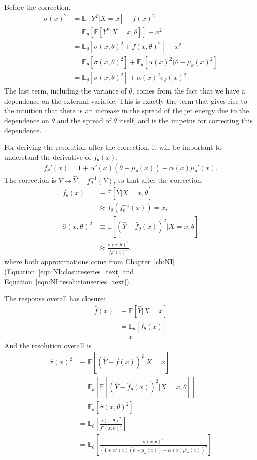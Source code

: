 Before the correction,
\begin{align}
  \sigma(x)^2 &=\mathbb{E}\left[Y^2|X=x\right]-f(x)^2\\
              &=\mathbb{E}_\theta\left[\mathbb{E}[Y^2|X=x,\theta]\right]-x^2\\
              &=\mathbb{E}_\theta\left[\sigma(x,\theta)^2+f(x,\theta)^2\right]-x^2\\
              &=\mathbb{E}_\theta\left[\sigma(x,\theta)^2\right]+\mathbb{E}_\theta\left[\alpha(x)^2(\theta-\mu_\theta(x)^2\right]\\
              &=\mathbb{E}_\theta\left[\sigma(x,\theta)^2\right]+\alpha(x)^2\sigma_\theta(x)^2
\end{align}
The last term, including the variance of $\theta$, comes from the fact that we have a dependence on the external variable.
This is exactly the term that gives rise to the intuition that there is an increase in the spread of the jet energy due to the dependence on $\theta$ and the spread of $\theta$ itself, and is the impetus for correcting this dependence.

For deriving the resolution after the correction, it will be important to understand the derivative of $f_\theta(x)$:
\begin{align}
  f_\theta'(x) = 1+\alpha'(x)(\theta-\mu_\theta(x)) - \alpha(x)\mu_\theta'(x).
\end{align}
The correction is $Y \mapsto \hat{Y} = f_\theta^{-1}(Y)$, so that after the correction:
\begin{align}
  \hat{f}_\theta(x) &\equiv \mathbb{E}\left[\hat{Y}|X=x,\theta\right]\\
  &\approx f_\theta(f_\theta^{-1}(x)) = x,\\
  \hat{\sigma}(x,\theta)^2 &\equiv \mathbb{E}\left[\left(\hat{Y}-\hat{f}_\theta(x)\right)^2|X=x,\theta\right]\\
  &\approx\frac{\sigma(x,\theta)^2}{f_\theta'(x)^2},
\end{align}
where both approximations come from Chapter~\ref{ch:NI} (Equation~\ref{eqn:NI:closureseries_text} and Equation~\ref{eqn:NI:resolutionseries_text}).

The response overall has closure:
\begin{align}
  \hat{f}(x) &\equiv \mathbb{E}\left[\hat{Y}|X=x\right]\\
  &= \mathbb{E}_\theta\left[ \hat{f}_\theta(x)\right]\\
  &= x
\end{align}
And the resolution overall is
\begin{align}
  \hat{\sigma}(x)^2 &\equiv \mathbb{E}\left[(\hat{Y}-\hat{f}(x))^2|X=x\right]\\
  &=\mathbb{E}_\theta\left[\mathbb{E}\left[(\hat{Y}-\hat{f}_\theta(x))^2|X=x,\theta\right]\right]\\
  &=\mathbb{E}_\theta\left[\hat{\sigma}(x,\theta)^2\right]\\
  &=\mathbb{E}_\theta\left[\frac{\sigma(x,\theta)^2}{f'(x,\theta)^2}\right]\\
  &=\mathbb{E}_\theta\left[\frac{\sigma(x,\theta)^2}{\left(1+\alpha'(x)(\theta-\mu_\theta(x)) -\alpha(x)\mu'_\theta(x)\right)^2}\right]
\end{align}

